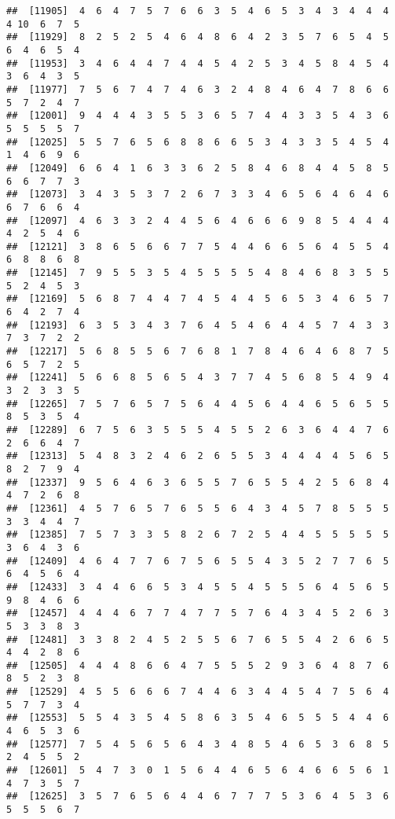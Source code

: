 \documentclass[
]{book}
\begin{document}
\begin{verbatim}
##  [11905]  4  6  4  7  5  7  6  6  3  5  4  6  5  3  4  3  4  4  4  4 10  6  7  5
##  [11929]  8  2  5  2  5  4  6  4  8  6  4  2  3  5  7  6  5  4  5  6  4  6  5  4
##  [11953]  3  4  6  4  4  7  4  4  5  4  2  5  3  4  5  8  4  5  4  3  6  4  3  5
##  [11977]  7  5  6  7  4  7  4  6  3  2  4  8  4  6  4  7  8  6  6  5  7  2  4  7
##  [12001]  9  4  4  4  3  5  5  3  6  5  7  4  4  3  3  5  4  3  6  5  5  5  5  7
##  [12025]  5  5  7  6  5  6  8  8  6  6  5  3  4  3  3  5  4  5  4  1  4  6  9  6
##  [12049]  6  6  4  1  6  3  3  6  2  5  8  4  6  8  4  4  5  8  5  6  6  7  7  3
##  [12073]  3  4  3  5  3  7  2  6  7  3  3  4  6  5  6  4  6  4  6  6  7  6  6  4
##  [12097]  4  6  3  3  2  4  4  5  6  4  6  6  6  9  8  5  4  4  4  4  2  5  4  6
##  [12121]  3  8  6  5  6  6  7  7  5  4  4  6  6  5  6  4  5  5  4  6  8  8  6  8
##  [12145]  7  9  5  5  3  5  4  5  5  5  5  4  8  4  6  8  3  5  5  5  2  4  5  3
##  [12169]  5  6  8  7  4  4  7  4  5  4  4  5  6  5  3  4  6  5  7  6  4  2  7  4
##  [12193]  6  3  5  3  4  3  7  6  4  5  4  6  4  4  5  7  4  3  3  7  3  7  2  2
##  [12217]  5  6  8  5  5  6  7  6  8  1  7  8  4  6  4  6  8  7  5  6  5  7  2  5
##  [12241]  5  6  6  8  5  6  5  4  3  7  7  4  5  6  8  5  4  9  4  3  2  3  3  5
##  [12265]  7  5  7  6  5  7  5  6  4  4  5  6  4  4  6  5  6  5  5  8  5  3  5  4
##  [12289]  6  7  5  6  3  5  5  5  4  5  5  2  6  3  6  4  4  7  6  2  6  6  4  7
##  [12313]  5  4  8  3  2  4  6  2  6  5  5  3  4  4  4  4  5  6  5  8  2  7  9  4
##  [12337]  9  5  6  4  6  3  6  5  5  7  6  5  5  4  2  5  6  8  4  4  7  2  6  8
##  [12361]  4  5  7  6  5  7  6  5  5  6  4  3  4  5  7  8  5  5  5  3  3  4  4  7
##  [12385]  7  5  7  3  3  5  8  2  6  7  2  5  4  4  5  5  5  5  5  3  6  4  3  6
##  [12409]  4  6  4  7  7  6  7  5  6  5  5  4  3  5  2  7  7  6  5  6  4  5  6  4
##  [12433]  3  4  4  6  6  5  3  4  5  5  4  5  5  5  6  4  5  6  5  9  8  4  6  6
##  [12457]  4  4  4  6  7  7  4  7  7  5  7  6  4  3  4  5  2  6  3  5  3  3  8  3
##  [12481]  3  3  8  2  4  5  2  5  5  6  7  6  5  5  4  2  6  6  5  4  4  2  8  6
##  [12505]  4  4  4  8  6  6  4  7  5  5  5  2  9  3  6  4  8  7  6  8  5  2  3  8
##  [12529]  4  5  5  6  6  6  7  4  4  6  3  4  4  5  4  7  5  6  4  5  7  7  3  4
##  [12553]  5  5  4  3  5  4  5  8  6  3  5  4  6  5  5  5  4  4  6  4  6  5  3  6
##  [12577]  7  5  4  5  6  5  6  4  3  4  8  5  4  6  5  3  6  8  5  2  4  5  5  2
##  [12601]  5  4  7  3  0  1  5  6  4  4  6  5  6  4  6  6  5  6  1  4  7  3  5  7
##  [12625]  3  5  7  6  5  6  4  4  6  7  7  7  5  3  6  4  5  3  6  5  5  5  6  7

\end{verbatim}
\end{document}

